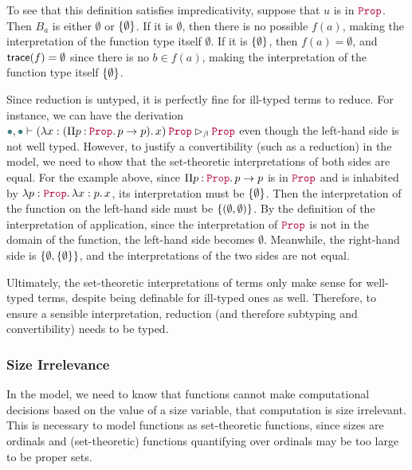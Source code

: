 To see that this definition satisfies impredicativity,
suppose that $u$ is in $\Prop$.
Then $B_a$ is either $\emptyset$ or $\{\emptyset\}$.
If it is $\emptyset$, then there is no possible $f(a)$,
making the interpretation of the function type itself $\emptyset$.
If it is $\{\emptyset\}$, then $f(a) = \emptyset$,
and $\textsf{trace}(f) = \emptyset$ since there is no $b \in f(a)$,
making the interpretation of the function type itself $\{\emptyset\}$.

Since reduction is untyped, it is perfectly fine for ill-typed terms to reduce.
For instance, we can have the derivation
$\mt, \mt \vdash \app{(\abs{x}{(\prod{p}{\Prop}{p \to p})}{x})}{\Prop} \rhd_\beta \Prop$
even though the left-hand side is not well typed.
However, to justify a convertibility (such as a reduction) in the model,
we need to show that the set-theoretic interpretations of both sides are equal.
For the example above, since $\prod{p}{\Prop}{p \to p}$ is in $\Prop$
and is inhabited by $\abs{p}{\Prop}{\abs{x}{p}{x}}$,
its interpretation must be $\{\emptyset\}$.
Then the interpretation of the function on the left-hand side must be $\{(\emptyset, \emptyset)\}$.
By the definition of the interpretation of application,
since the interpretation of $\Prop$ is not in the domain of the function,
the left-hand side becomes $\emptyset$.
Meanwhile, the right-hand side is $\{\emptyset, \{\emptyset\}\}$,
and the interpretations of the two sides are not equal.


Ultimately, the set-theoretic interpretations of terms only make sense for well-typed terms,
despite being definable for ill-typed ones as well.
Therefore, to ensure a sensible interpretation,
reduction (and therefore subtyping and convertibility) needs to be typed.

\subsubsection{Size Irrelevance}

In the model, we need to know that functions cannot make computational decisions
based on the value of a size variable, \ie that computation is size irrelevant.
This is necessary to model functions as set-theoretic functions, since sizes are
ordinals and (set-theoretic) functions quantifying over ordinals may be too
large to be proper sets.

